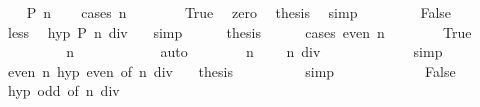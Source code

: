\begin{isabellebody}
\ \ \isamarkupfalse%
\ {\isachardoublequoteopen}P\ n{\isachardoublequoteclose}\isanewline
\ \ \isamarkupfalse%
\ {\isacharparenleft}{\kern0pt}cases\ {\isachardoublequoteopen}n\ {\isacharequal}{\kern0pt}\ {}{\isachardoublequoteclose}{\isacharparenright}{\kern0pt}\isanewline
\ \ \ \ \isamarkupfalse%
\ True\ \isamarkupfalse%
\ zero\ \isamarkupfalse%
\ {\isacharquery}{\kern0pt}thesis\ \isamarkupfalse%
\ simp\isanewline
\ \ \isamarkupfalse%
\isanewline
\ \ \ \ \isamarkupfalse%
\ False\isanewline
\ \ \ \ \isamarkupfalse%
\ less\ \isamarkupfalse%
\ hyp{\isacharcolon}{\kern0pt}\ {\isachardoublequoteopen}P\ {\isacharparenleft}{\kern0pt}n\ div\ {}{\isacharparenright}{\kern0pt}{\isachardoublequoteclose}\ \isamarkupfalse%
\ simp\isanewline
\ \ \ \ \isamarkupfalse%
\ {\isacharquery}{\kern0pt}thesis\isanewline
\ \ \ \ \isamarkupfalse%
\ {\isacharparenleft}{\kern0pt}cases\ {\isachardoublequoteopen}even\ n{\isachardoublequoteclose}{\isacharparenright}{\kern0pt}\isanewline
\ \ \ \ \ \ \isamarkupfalse%
\ True\isanewline
\ \ \ \ \ \ \isamarkupfalse%
\ \isamarkupfalse%
\ {\isachardoublequoteopen}n\ {\isasymnoteq}\ {}{\isachardoublequoteclose}\isanewline
\ \ \ \ \ \ \ \ \isamarkupfalse%
\ auto\isanewline
\ \ \ \ \ \ \isamarkupfalse%
\ {\isacartoucheopen}n\ {\isasymnoteq}\ {}{\isacartoucheclose}\ \isamarkupfalse%
\ {\isachardoublequoteopen}n\ div\ {}\ {\isachargreater}{\kern0pt}\ {}{\isachardoublequoteclose}\isanewline
\ \ \ \ \ \ \ \ \isamarkupfalse%
\ simp\isanewline
\ \ \ \ \ \ \isamarkupfalse%
\ {\isacartoucheopen}even\ n{\isacartoucheclose}\ hyp\ even\ {\isacharbrackleft}{\kern0pt}of\ {\isachardoublequoteopen}n\ div\ {}{\isachardoublequoteclose}{\isacharbrackright}{\kern0pt}\ \isamarkupfalse%
\ {\isacharquery}{\kern0pt}thesis\isanewline
\ \ \ \ \ \ \ \ \isamarkupfalse%
\ simp\isanewline
\ \ \ \ \isamarkupfalse%
\isanewline
\ \ \ \ \ \ \isamarkupfalse%
\ False\isanewline
\ \ \ \ \ \ \isamarkupfalse%
\ hyp\ odd\ {\isacharbrackleft}{\kern0pt}of\ {\isachardoublequoteopen}n\ div\ {}{\isachardoublequoteclose}{\isacharbrackright}{\kern0pt}\ \isamarkupfalse%

\end{isabellebody}
